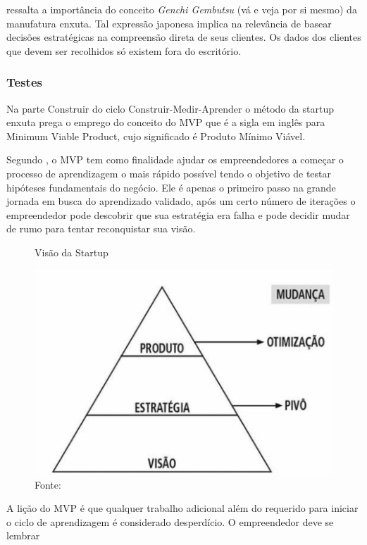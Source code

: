  ressalta a importância do conceito \textit {Genchi Gembutsu} (vá e veja por si mesmo) da manufatura enxuta. Tal expressão japonesa implica na relevância de basear decisões estratégicas na compreensão direta de seus clientes. Os dados dos clientes que devem ser recolhidos só existem fora do escritório.

\subsubsection{Testes}
\label{cha:testes}

Na parte Construir do ciclo Construir-Medir-Aprender o método da startup enxuta prega o emprego do conceito do MVP que é a sigla em inglês para Minimum Viable Product, cujo significado é Produto Mínimo Viável.

Segundo , o MVP tem como finalidade ajudar os empreendedores a começar o processo de aprendizagem o mais rápido possível tendo o objetivo de testar hipóteses fundamentais do negócio. Ele é apenas o primeiro passo na grande jornada em busca do aprendizado validado, após um certo número de iterações o empreendedor pode descobrir que sua estratégia era falha e pode decidir mudar de rumo para tentar reconquistar sua visão.

\begin{figure}[H]
\caption{Visão da Startup}
\centerline{\includegraphics[scale=0.2]{img/pivotar}}
\label{fig:pivotar}
\caption* {Fonte: }
\end{figure}

A lição do MVP é que qualquer trabalho adicional além do requerido para iniciar o ciclo de aprendizagem é considerado desperdício. O empreendedor deve se lembrar

